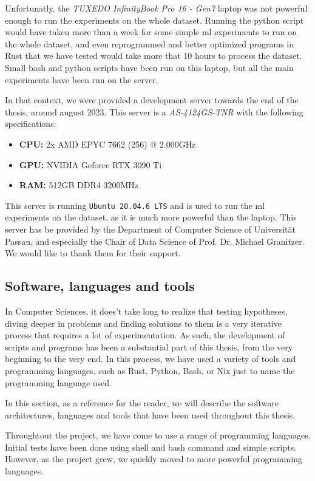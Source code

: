     Unfortunatly, the \textit{TUXEDO InfinityBook Pro 16 - Gen7} laptop was not powerful enough to run the experiments on the whole dataset. Running the python script would have taken more than a week for some simple \acrshort{ml} experiments to run on the whole dataset, and even reprogrammed and better optimized programs in Rust that we have tested would take more that 10 hours to process the dataset. Small bash and python scripts have been run on this laptop, but all the main experiments have been run on the server.
    
    In that context, we were provided a development server towards the end of the thesis, around august 2023. This server is a \textit{AS-4124GS-TNR} with the following specifications:

    \begin{itemize}
        \item \textbf{CPU:} 2x AMD EPYC 7662 (256) @ 2.000GHz
        \item \textbf{GPU:} NVIDIA Geforce RTX 3090 Ti
        \item \textbf{RAM:} 512GB DDR4 3200MHz
    \end{itemize}

    This server is running \texttt{Ubuntu 20.04.6 LTS} and is used to run the \acrshort{ml} experiments on the dataset, as it is much more powerful than the laptop. This server has be provided by the Department of Computer Science of Universität Passau, and especially the Chair of Data Science of Prof. Dr. Michael Granitzer. We would like to thank them for their support.

    \subsection{Software, languages and tools}
    In Computer Sciences, it does't take long to realize that testing hypotheses, diving deeper in problems and finding solutions to them is a very iterative process that requires a lot of experimentation. As such, the development of scripts and programs has been a substantial part of this thesis, from the very beginning to the very end. In this process, we have used a variety of tools and programming languages, such as Rust, Python, Bash, or Nix just to name the programming language used.

    In this section, as a reference for the reader, we will describe the software architectures, languages and tools that have been used throughout this thesis.

    Throughtout the project, we have come to use a range of programming languages. Initial tests have been done using shell and bash command and simple scripts. However, as the project grew, we quickly moved to more powerful programming languages. 

